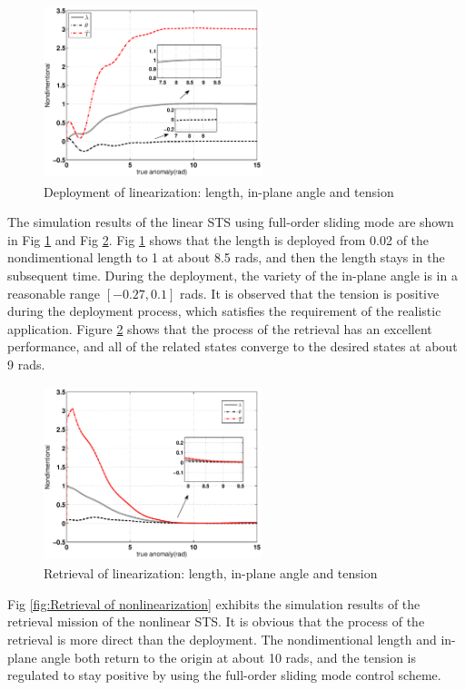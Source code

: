 \documentclass[conference]{IEEEtran}
\theoremstyle{plain}
\begin{document}
\begin{figure}
\centering
\includegraphics[width=180pt,height=144pt]{linear_deployment.eps}
\caption{Deployment of linearization: length, in-plane angle and tension}
\label{fig:Deployment of linearization}
\end{figure}
The simulation results of the linear STS using full-order sliding mode are shown in Fig \ref{fig:Deployment of linearization} and Fig \ref{fig:Retrieval of linearization}. Fig \ref{fig:Deployment of linearization} shows that the length is deployed from 0.02 of the nondimentional length to 1 at about 8.5 rads, and then the length stays in the subsequent time. During the deployment, the variety of the in-plane angle is in a reasonable range $[-0.27, 0.1]$ rads. It is observed that the tension is positive during the deployment process, which satisfies the requirement of the realistic application. Figure \ref{fig:Retrieval of linearization} shows that the process of the retrieval has an excellent performance, and all of the related states converge to the desired states at about 9 rads.\par
\begin{figure}
\centering
\includegraphics[width=180pt,height=144pt]{linear_retrieval.eps}
\caption{Retrieval of linearization: length, in-plane angle and tension}
\label{fig:Retrieval of linearization}
\end{figure}
Fig \ref{fig:Retrieval of nonlinearization} exhibits the simulation results of the retrieval mission of the nonlinear STS. It is obvious that the process of the retrieval is more direct than the deployment. The nondimentional length and in-plane angle both return to the origin at about 10 rads, and the tension is regulated to stay positive by using the full-order sliding mode control scheme.\par
\end{document}
